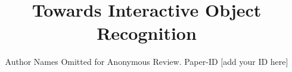 \title{Towards Interactive Object Recognition}

\author{Author Names Omitted for Anonymous Review. Paper-ID [add your ID here]}






\maketitle